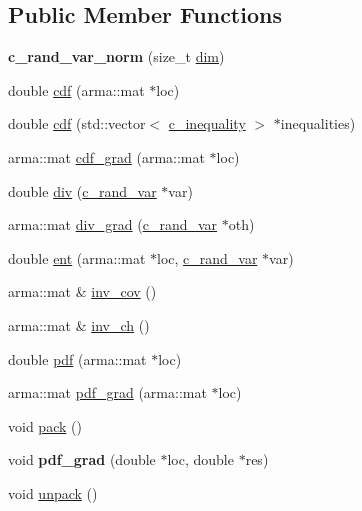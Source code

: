 \subsection*{\-Public \-Member \-Functions}
\begin{DoxyCompactItemize}
\item 
\hypertarget{classc__rand__var__norm_ac8f6ce8e3a4a1e3edc21b1455c3641c0}{{\bfseries c\-\_\-rand\-\_\-var\-\_\-norm} (size\-\_\-t \hyperlink{classc__rand__var_a6bdf916d8aa06727128106e54bc36813}{dim})}\label{classc__rand__var__norm_ac8f6ce8e3a4a1e3edc21b1455c3641c0}

\item 
double \hyperlink{classc__rand__var__norm_a56fc03e43408f91e8f4e75c99bf2f4d7}{cdf} (arma\-::mat $\ast$loc)
\item 
double \hyperlink{classc__rand__var__norm_a916fcce06db769b62842d1836105af9a}{cdf} (std\-::vector$<$ \hyperlink{classc__inequality}{c\-\_\-inequality} $>$ $\ast$inequalities)
\item 
arma\-::mat \hyperlink{classc__rand__var__norm_aded89fa173879155b4392478ad5d6516}{cdf\-\_\-grad} (arma\-::mat $\ast$loc)
\item 
double \hyperlink{classc__rand__var__norm_aba262aea9fece40742860ab75c90e187}{div} (\hyperlink{classc__rand__var}{c\-\_\-rand\-\_\-var} $\ast$var)
\item 
arma\-::mat \hyperlink{classc__rand__var__norm_a94e7cee17224da9a2f2f7d997a0c477c}{div\-\_\-grad} (\hyperlink{classc__rand__var}{c\-\_\-rand\-\_\-var} $\ast$oth)
\item 
double \hyperlink{classc__rand__var__norm_ad367a0e8dcd7b6169092c00bcc5a37e6}{ent} (arma\-::mat $\ast$loc, \hyperlink{classc__rand__var}{c\-\_\-rand\-\_\-var} $\ast$var)
\item 
arma\-::mat \& \hyperlink{classc__rand__var__norm_a0cc7b37a99ce074c96d51bc362f09384}{inv\-\_\-cov} ()
\item 
arma\-::mat \& \hyperlink{classc__rand__var__norm_acfa588734c2f831d263ab049b2363cc3}{inv\-\_\-ch} ()
\item 
double \hyperlink{classc__rand__var__norm_a403476d54f19da0350700b343a7266b2}{pdf} (arma\-::mat $\ast$loc)
\item 
arma\-::mat \hyperlink{classc__rand__var__norm_adc6534281e460b63961d4359828c9250}{pdf\-\_\-grad} (arma\-::mat $\ast$loc)
\item 
void \hyperlink{classc__rand__var__norm_a970f1cf5ef6c612a2ecb80c7a144415d}{pack} ()
\item 
\hypertarget{classc__rand__var__norm_a40307b1dd13ffb5f4e951e1b8d4c1691}{void {\bfseries pdf\-\_\-grad} (double $\ast$loc, double $\ast$res)}\label{classc__rand__var__norm_a40307b1dd13ffb5f4e951e1b8d4c1691}

\item 
void \hyperlink{classc__rand__var__norm_a2f7c2b04715b73ac9a7dca38d9eec2b8}{unpack} ()
\end{DoxyCompactItemize}
